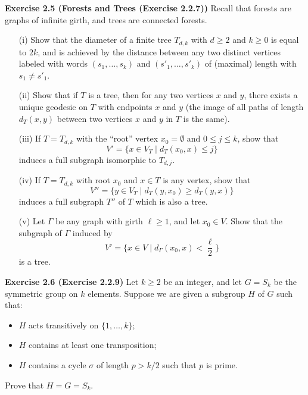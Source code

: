 \documentclass[12pt, a4paper]{article}
\begin{document}
\textbf{Exercise 2.5 (Forests and Trees (Exercise 2.2.7))}
Recall that forests are graphs of infinite girth, and trees are connected forests.
\begin{itemize}
    \item[(i)] Show that the diameter of a finite tree $T_{d,k}$ with $d \geq 2$ and $k \geq 0$ is equal to $2k$, and is achieved by the distance between any two distinct vertices labeled with words $(s_1, \dots, s_k)$ and $(s'_1, \dots, s'_k)$ of (maximal) length with $s_1 \neq s'_1$.
    \item[(ii)] Show that if $T$ is a tree, then for any two vertices $x$ and $y$, there exists a unique geodesic on $T$ with endpoints $x$ and $y$ (the image of all paths of length $d_T(x, y)$ between two vertices $x$ and $y$ in $T$ is the same).
    \item[(iii)] If $T = T_{d,k}$ with the ``root'' vertex $x_0 = \emptyset$ and $0 \leq j \leq k$, show that
    \[
    V' = \{x \in V_T \mid d_T(x_0, x) \leq j\}
    \]
    induces a full subgraph isomorphic to $T_{d,j}$.
    \item[(iv)] If $T = T_{d,k}$ with root $x_0$ and $x \in T$ is any vertex, show that
    \[
    V'' = \{y \in V_T \mid d_T(y, x_0) \geq d_T(y, x)\}
    \]
    induces a full subgraph $T''$ of $T$ which is also a tree.
    \item[(v)] Let $\Gamma$ be any graph with girth $\ell \geq 1$, and let $x_0 \in V$. Show that the subgraph of $\Gamma$ induced by
    \[
    V' = \{x \in V \mid d_\Gamma(x_0, x) < \frac{\ell}{2}\}
    \]
    is a tree.
\end{itemize}

\textbf{Exercise 2.6 (Exercise 2.2.9)}
Let $k \geq 2$ be an integer, and let $G = S_k$ be the symmetric group on $k$ elements. Suppose we are given a subgroup $H$ of $G$ such that:
\begin{itemize}
    \item $H$ acts transitively on $\{1, \dots, k\}$;
    \item $H$ contains at least one transposition;
    \item $H$ contains a cycle $\sigma$ of length $p > k/2$ such that $p$ is prime.
\end{itemize}
Prove that $H = G = S_k$.
\end{document}
